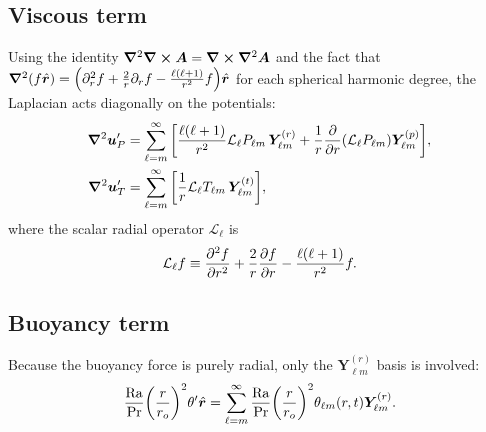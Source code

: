 \documentclass[11pt]{article}
\numberwithin{equation}{section}
\begin{document}
\subsection{Viscous term}
Using the identity $\grad^2 \curl \bm{A} = \curl \grad^2 \bm{A}$ and the fact that $\grad^2 (f \hat{\bm{r}}) = \qty( \partial_r^2 f + \frac{2}{r} \partial_r f - \frac{\ell(\ell+1)}{r^2} f ) \hat{\bm{r}}$ for each spherical harmonic degree, the Laplacian acts diagonally on the potentials:
\begin{align}
  \grad^2 \bm{u}_P' &= \sum_{\ell=m}^{\infty}
     \qty[ \frac{\ell (\ell+1)}{r^2} \mathcal{L}_\ell P_{\ell m} \, \bm{Y}_{\ell m}^{(r)}
          + \frac{1}{r} \pdv{}{r} \qty( \mathcal{L}_\ell P_{\ell m} ) \bm{Y}_{\ell m}^{(p)} ],
  \label{eq:laplacian_poloidal} \\
  \grad^2 \bm{u}_T' &= \sum_{\ell=m}^{\infty}
     \qty[ \frac{1}{r} \mathcal{L}_\ell T_{\ell m} \, \bm{Y}_{\ell m}^{(t)} ],
  \label{eq:laplacian_toroidal}
\end{align}
where the scalar radial operator $\mathcal{L}_\ell$ is
\begin{equation}
  \mathcal{L}_\ell f \equiv \pdv[2]{f}{r} + \frac{2}{r} \pdv{f}{r} - \frac{\ell (\ell+1)}{r^2} f .
  \label{eq:radial_operator}
\end{equation}

\subsection{Buoyancy term}
Because the buoyancy force is purely radial, only the $\bm{Y}_{\ell m}^{(r)}$ basis is involved:
\begin{equation}
  \frac{\mathrm{Ra}}{\mathrm{Pr}} \qty(\frac{r}{r_o})^2 \theta' \hat{\bm{r}}
  = \sum_{\ell=m}^{\infty} \frac{\mathrm{Ra}}{\mathrm{Pr}} \qty(\frac{r}{r_o})^2 \theta_{\ell m}(r,t)
    \bm{Y}_{\ell m}^{(r)}.
  \label{eq:buoyancy_term}
\end{equation}
\end{document}
